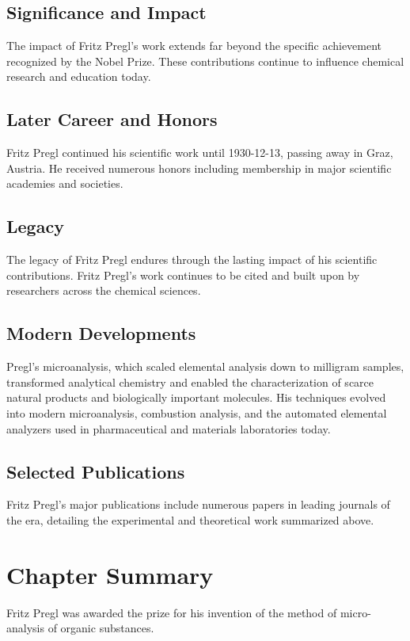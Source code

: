 \subsection*{Significance and Impact}

The impact of Fritz Pregl's work extends far beyond the specific achievement recognized by the Nobel Prize.
These contributions continue to influence chemical research and education today.

\subsection*{Later Career and Honors}

Fritz Pregl continued his scientific work until 1930-12-13, passing away in Graz, Austria.
He received numerous honors including membership in major scientific academies and societies.

\subsection*{Legacy}

The legacy of Fritz Pregl endures through the lasting impact of his scientific contributions.
Fritz Pregl's work continues to be cited and built upon by researchers across the chemical sciences.

\subsection*{Modern Developments}

Pregl's microanalysis, which scaled elemental analysis down to milligram samples, transformed analytical chemistry and enabled the characterization of scarce natural products and biologically important molecules. His techniques evolved into modern microanalysis, combustion analysis, and the automated elemental analyzers used in pharmaceutical and materials laboratories today.

\subsection*{Selected Publications}

Fritz Pregl's major publications include numerous papers in leading journals of the era, detailing the experimental and theoretical work summarized above.

\clearpage

\section*{Chapter Summary}

Fritz Pregl was awarded the prize for his invention of the method of micro-analysis of organic substances.
